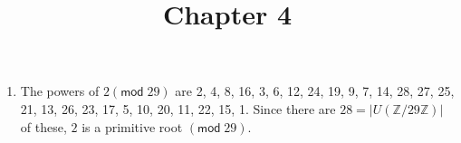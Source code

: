 \documentclass[12pt]{article}
\title{Chapter 4}
\author{}\date{}
\renewcommand{\pmod}[1]{\left(\mathsf{mod}\;#1\right)}
\begin{document}
\maketitle
\thispagestyle{empty}

\begin{enumerate}
\item %
The powers of $2\pmod{29}$ are
2, 4, 8, 16, 3, 6, 12, 24, 19, 9,
7, 14, 28, 27, 25, 21, 13, 26, 23, 17, 5, 10, 20, 11, 22, 15, 1.
Since there are $28=\left|U\left(\mathbb{Z}/29\mathbb{Z}\right)\right|$
of these, $2$ is a primitive root $\pmod{29}$.
\end{enumerate}
\end{document}

